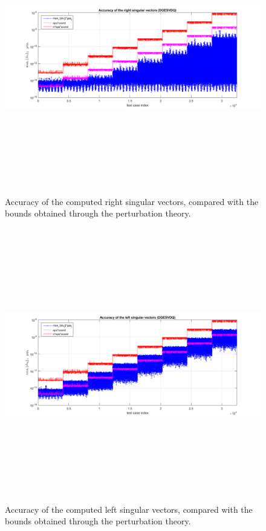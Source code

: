 \documentclass[12pt, a4paper, final]{article}
\numberwithin{equation}{section}
\begin{document}
\begin{figure}[h]
	\begin{center}
		\includegraphics[width=6.3in,height=4.7in]{Fig4.png}
	\end{center}	
	\caption{ \label{fig:4} Accuracy of the computed right singular vectors, compared with the bounds obtained through the perturbation theory.}
\end{figure}

\begin{figure}[h]
	\begin{center}
		\includegraphics[width=6.3in,height=4.7in]{Fig5.png}
	\end{center}	
	\caption{ \label{fig:5} Accuracy of the computed left singular vectors, compared with the bounds obtained through the perturbation theory.}
\end{figure} 
\end{document}
